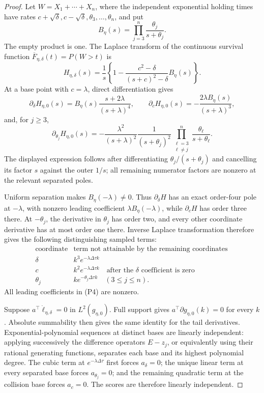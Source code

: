 \begin{proof}
Let \(W=X_1+\cdots+X_n\), where the independent exponential holding times
have rates \(c+\sqrt\delta,c-\sqrt\delta,\theta_3,\ldots,\theta_n\), and put
\[
 B_\eta(s)=\prod_{j=3}^n\frac{\theta_j}{s+\theta_j}.
\]
The empty product is one.  The Laplace transform of the continuous survival
function \(\overline F_{\eta,\delta}(t)=P(W>t)\) is
\[
 H_{\eta,\delta}(s)=\frac1s\left\{1-
 \frac{c^2-\delta}{(s+c)^2-\delta}B_\eta(s)\right\}.
\tag{P1}
\]
At a base point with \(c=\lambda\), direct differentiation gives
\[
 \partial_\delta H_{\eta,0}(s)
 =B_\eta(s)\frac{s+2\lambda}{(s+\lambda)^4},
 \qquad
 \partial_cH_{\eta,0}(s)
 =-\frac{2\lambda B_\eta(s)}{(s+\lambda)^3},
\tag{P2}
\]
and, for \(j\ge3\),
\[
 \partial_{\theta_j}H_{\eta,0}(s)
 =-\frac{\lambda^2}{(s+\lambda)^2}
 \frac{1}{(s+\theta_j)^2}
 \prod_{\substack{\ell=3\\\ell\ne j}}^n
 \frac{\theta_\ell}{s+\theta_\ell}.
\tag{P3}
\]
The displayed expression follows after differentiating
\(\theta_j/(s+\theta_j)\) and cancelling its factor \(s\) against the outer
\(1/s\); all remaining numerator factors are nonzero at the relevant
separated poles.

Uniform separation makes \(B_\eta(-\lambda)\ne0\).  Thus
\(\partial_\delta H\) has an exact order-four pole at \(-\lambda\), with
nonzero leading coefficient \(\lambda B_\eta(-\lambda)\), while
\(\partial_cH\) has order three there.  At \(-\theta_j\), the derivative in
\(\theta_j\) has order two, and every other coordinate derivative has at most
order one there.  Inverse Laplace transformation therefore gives the following
distinguishing sampled terms:
\[
 \begin{array}{c|c}
 \text{coordinate}&\text{term not attainable by the remaining coordinates}\ \\
 \hline
 \delta& k^3e^{-\lambda\Delta\tau k}\\
 c& k^2e^{-\lambda\Delta\tau k}\quad\text{after the \(\delta\) coefficient is zero}\\
 \theta_j& k e^{-\theta_j\Delta\tau k}\quad(3\le j\le n).
 \end{array}
\tag{P4}
\]
All leading coefficients in \textup{(P4)} are nonzero.

Suppose \(a^\top\dot\ell_{\eta,\delta}=0\) in
\(L^2(g_{\eta,0})\).  Full support gives
\(a^\top\partial g_{\eta,0}(k)=0\) for every \(k\).  Absolute summability
then gives the same identity for the tail derivatives.  Exponential-polynomial
sequences at distinct bases are linearly independent: applying successively
the difference operators \(E-z_j\), or equivalently using their rational
generating functions, separates each base and its highest polynomial degree.
The cubic term at \(e^{-\lambda\Delta\tau}\) first forces
\(a_\delta=0\); the unique linear term at every separated base forces
\(a_{\theta_j}=0\); and the remaining quadratic term at the collision base
forces \(a_c=0\).  The scores are therefore linearly independent.


\end{proof}
